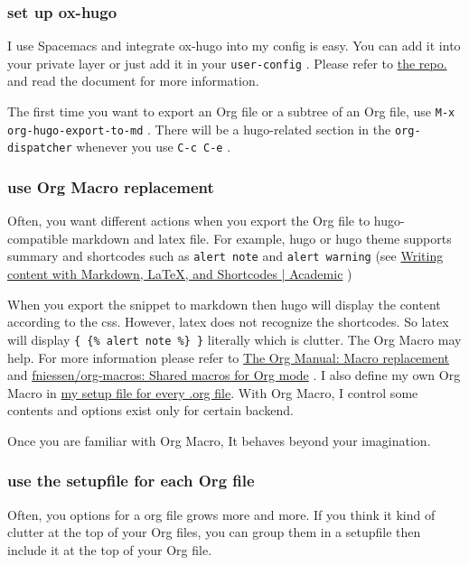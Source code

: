 \subsubsection{set up ox-hugo}
\label{sec:org0a52bcd}


I use Spacemacs and integrate ox-hugo into my config is easy. You can add it
into your private layer or just add it in your \texttt{user-config} . Please refer to
\href{https://github.com/kaushalmodi/ox-hugo}{the repo.} and read the document for more information.

The first time you want to export an Org file or a subtree of an Org file, use
\texttt{M-x org-hugo-export-to-md} . There will be a hugo-related section in the
\texttt{org-dispatcher} whenever you use \texttt{C-c C-e} .
\subsubsection{use Org Macro replacement}
\label{sec:orgaa4e7a2}


Often, you want different actions when you export the Org file to
hugo-compatible markdown and latex file. For example, hugo or hugo theme supports
summary and shortcodes such as \texttt{alert note} and \texttt{alert warning} (see  \href{https://sourcethemes.com/academic/docs/writing-markdown-latex/}{Writing
content with Markdown, \LaTeX{}, and Shortcodes | Academic} )

When you export the snippet to markdown then hugo will display the content
according to the css. However, latex does not recognize the shortcodes. So latex
will display \texttt{\{ \{\% alert note \%\} \}} literally which is clutter. The Org Macro may
help. For more information please refer to \href{https://orgmode.org/manual/Macro-replacement.html}{The Org Manual: Macro replacement} and
\href{https://github.com/fniessen/org-macros}{fniessen/org-macros: Shared macros for Org mode} . I also define my own Org Macro
in \href{https://github.com/msteamc/.spacemacs.d/blob/master/org-templates/enpost.org}{my setup file for every .org file}. With Org Macro, I control some contents
and options exist only for certain backend.

Once you are familiar with Org Macro, It behaves beyond your imagination.
\subsubsection{use the setupfile for each Org file}
\label{sec:orgd15a7e2}


Often, you options for a org file grows more and more. If you think it kind of
clutter at the top of your Org files, you can group them in a setupfile then
include it at the top of your Org file.

